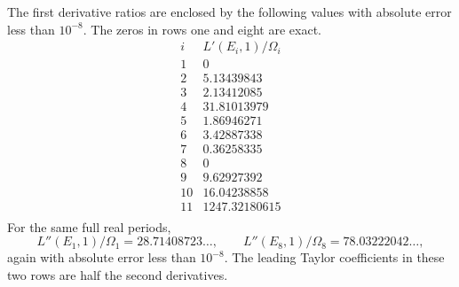 \begin{proposition}\hypertarget{tag-0011}{}\label{ari:C.6.R2}

The first derivative ratios are enclosed by the following values
with absolute error less than $10^{-8}$. The zeros in rows one
and eight are exact.
\[
\begin{array}{r|r}
i&L'(E_i,1)/\Omega_i\\\hline
1&0\\
2&5.13439843\\
3&2.13412085\\
4&31.81013979\\
5&1.86946271\\
6&3.42887338\\
7&0.36258335\\
8&0\\
9&9.62927392\\
10&16.04238858\\
11&1247.32180615\\
\end{array}
\]
For the same full real periods,
\[
 L''(E_1,1)/\Omega_1=28.71408723\ldots,\qquad
 L''(E_8,1)/\Omega_8=78.03222042\ldots,
\]
again with absolute error less than $10^{-8}$.
The leading Taylor coefficients in these two rows are half
the second derivatives.
\end{proposition}


